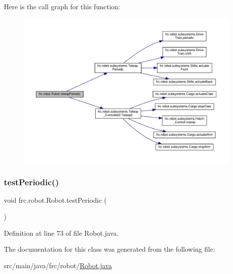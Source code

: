 Here is the call graph for this function\+:\nopagebreak
\begin{figure}[H]
\begin{center}
\leavevmode
\includegraphics[width=350pt]{dd/d54/classfrc_1_1robot_1_1_robot_ae807171661cbc29081bc10f06d6831e7_cgraph}
\end{center}
\end{figure}
\mbox{\label{classfrc_1_1robot_1_1_robot_abd152f34b9f33d5cdf835aa61331f33e}} 
\subsubsection{\texorpdfstring{test\+Periodic()}{testPeriodic()}}
{\footnotesize\ttfamily void frc.\+robot.\+Robot.\+test\+Periodic (\begin{DoxyParamCaption}{ }\end{DoxyParamCaption})}



Definition at line 73 of file Robot.\+java.



The documentation for this class was generated from the following file\+:\begin{DoxyCompactItemize}
\item 
src/main/java/frc/robot/\hyperlink{_robot_8java}{Robot.\+java}\end{DoxyCompactItemize}
